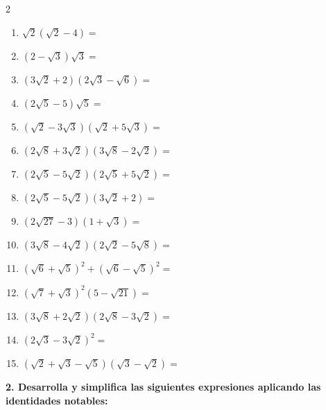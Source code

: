 \documentclass[11pt,a4paper]{article}
\begin{document}
\begin{multicols}{2}
\begin{enumerate}[label=\textbf{\arabic*.}]
    \item $\sqrt{2}\left(\sqrt{2} - 4\right) =$
    \item $\left(2 - \sqrt{3}\right)\sqrt{3} =$
    \item $\left(3\sqrt{2} + 2\right)\left(2\sqrt{3} - \sqrt{6}\right) =$
    \item $\left(2\sqrt{5} - 5\right)\sqrt{5} =$
    \item $\left(\sqrt{2} - 3\sqrt{3}\right)\left(\sqrt{2} + 5\sqrt{3}\right) =$
    \item $\left(2\sqrt{8} + 3\sqrt{2}\right)\left(3\sqrt{8} - 2\sqrt{2}\right) =$
    \item $\left(2\sqrt{5} - 5\sqrt{2}\right)\left(2\sqrt{5} + 5\sqrt{2}\right) =$
    \item $\left(2\sqrt{5} - 5\sqrt{2}\right)\left(3\sqrt{2} + 2\right) =$
    \item $\left(2\sqrt{27} - 3\right)\left(1 + \sqrt{3}\right) =$
    \item $\left(3\sqrt{8} - 4\sqrt{2}\right)\left(2\sqrt{2} - 5\sqrt{8}\right) =$
    \item $\left(\sqrt{6} + \sqrt{5}\right)^2 + \left(\sqrt{6} - \sqrt{5}\right)^2 =$
    \item $\left(\sqrt{7} + \sqrt{3}\right)^2 \left(5 - \sqrt{21}\right) =$
    \item $\left(3\sqrt{8} + 2\sqrt{2}\right)\left(2\sqrt{8} - 3\sqrt{2}\right) =$
    \item $\left(2\sqrt{3} - 3\sqrt{2}\right)^2 =$
    \item $\left(\sqrt{2} + \sqrt{3} - \sqrt{5}\right)\left(\sqrt{3} - \sqrt{2}\right) =$
\end{enumerate}
\end{multicols} %


\textbf{2. Desarrolla y simplifica las siguientes expresiones aplicando las identidades notables:}
\end{document}
